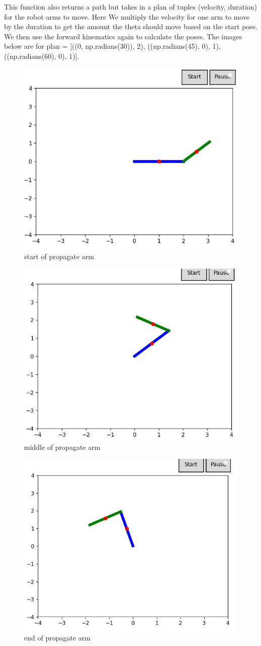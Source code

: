 \documentclass{article}
\begin{document}
This function also returns a path but takes in a plan of tuples (velocity, duration) for the robot arms to move. Here We multiply the velocity for one arm to move by the duration to get the amount the theta should move based on the start pose. We then use the forward kinematics again to calculate the poses. The images below are for plan = [((0, np.radians(30)), 2), ((np.radians(45), 0), 1), ((np.radians(60), 0), 1)].

\begin{figure} [H]
    \centering
    \includegraphics[width=0.5\linewidth]{latex_media/component_4_start of propagate arm.jpg}
    \caption{start of propagate arm}
    \label{fig:12}
\end{figure}

\begin{figure} [H]
    \centering
    \includegraphics[width=0.5\linewidth]{latex_media/component_4_middle of propagate arm.jpg}
    \caption{middle of propagate arm}
    \label{fig:13}
\end{figure}

\begin{figure} [H]
    \centering
    \includegraphics[width=0.5\linewidth]{latex_media/component_4_end of propagate arm.jpg}
    \caption{end of propagate arm}
    \label{fig:14}
\end{figure}
\end{document}
